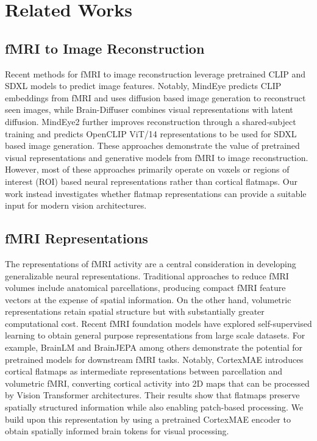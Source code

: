 \section{Related Works}
\label{sec:related_works}
\subsection{fMRI to Image Reconstruction}
Recent methods for fMRI to image reconstruction leverage pretrained CLIP and SDXL models to predict image features. Notably, MindEye \cite{scotti2023reconstructingmindseyefmritoimage} predicts CLIP embeddings from fMRI and uses diffusion based image generation to reconstruct seen images, while Brain-Diffuser \cite{ozcelik2023brain} combines visual representations with latent diffusion. MindEye2 further improves reconstruction through a shared-subject training and predicts OpenCLIP ViT/14 representations \cite{schuhmann2022laionb, ilharco_gabriel_2021_5143773} to be used for SDXL based image generation. These approaches demonstrate the value of pretrained visual representations and generative models from fMRI to image reconstruction. However, most of these approaches primarily operate on voxels or regions of interest (ROI) based neural representations rather than cortical flatmaps. Our work instead investigates whether flatmap representations can provide a suitable input for modern vision architectures.

\subsection{fMRI Representations}
The representations of fMRI activity are a central consideration in developing generalizable neural representations. Traditional approaches to reduce fMRI volumes include anatomical parcellations, producing compact fMRI feature vectors at the expense of spatial information. On the other hand, volumetric representations retain spatial structure but with substantially greater computational cost. Recent fMRI foundation models have explored self-supervised learning to obtain general purpose representations from large scale datasets. For example, BrainLM \cite{Caro2023.09.12.557460} and BrainJEPA \cite{dong2024brainjepabraindynamicsfoundation}  among others demonstrate the potential for pretrained models for downstream fMRI tasks. Notably, CortexMAE introduces cortical flatmaps as intermediate representations between parcellation and volumetric fMRI, converting cortical activity into 2D maps that can be processed by Vision Transformer architectures. Their results show that flatmaps preserve spatially structured information while also enabling patch-based processing. We build upon this representation by using a pretrained CortexMAE encoder to obtain spatially informed brain tokens for visual processing.

